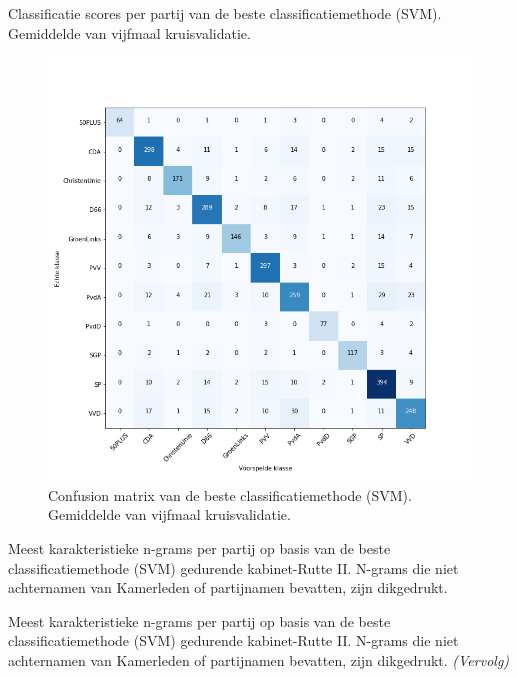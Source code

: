 \begin{table}[H]
\caption{Classificatie scores per partij van de beste classificatiemethode (SVM). Gemiddelde van vijfmaal kruisvalidatie.}
\label{tab:classrapport}
\centering

\end{table}


\begin{figure}[H]
  \centering
    \includegraphics[width=0.50\paperwidth]{Verslag/Tables/confusionmatrix.png}
\caption{Confusion matrix van de beste classificatiemethode (SVM). Gemiddelde van vijfmaal kruisvalidatie.}
\label{fig:confusionmatrix}
\end{figure}



\begin{table}[H]
\caption{Meest karakteristieke n-grams per partij op basis van de beste classificatiemethode (SVM) gedurende kabinet-Rutte II. N-grams die niet achternamen van Kamerleden of partijnamen bevatten, zijn dikgedrukt. }
\label{tab:MostImportantWords} 
\centering
\hspace*{-1in}
 
\end{table} 
\addtocounter{table}{-1} 
\begin{table}[H]
\caption{Meest karakteristieke n-grams per partij op basis van de beste classificatiemethode (SVM) gedurende kabinet-Rutte II. N-grams die niet achternamen van Kamerleden of partijnamen bevatten, zijn dikgedrukt.  \emph{(Vervolg)}} 
\centering
\hspace*{-1.3in}
 
\end{table}

